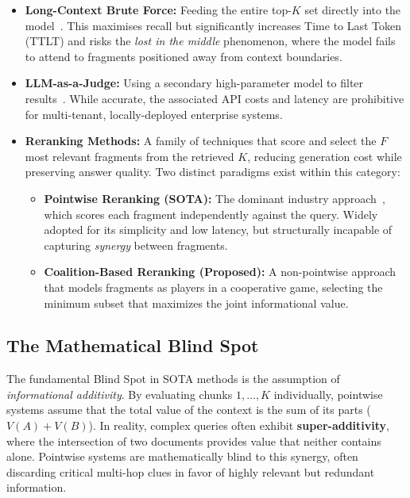 \begin{itemize}
    \item \textbf{Long-Context Brute Force:} Feeding the entire top-$K$ set directly into the model~\cite{LongContext}. This maximises recall but significantly increases Time to Last Token (TTLT) and risks the \emph{lost in the middle} phenomenon, where the model fails to attend to fragments positioned away from context boundaries.
    \item \textbf{LLM-as-a-Judge:} Using a secondary high-parameter model to filter results~\cite{LLLMJudges}. While accurate, the associated API costs and latency are prohibitive for multi-tenant, locally-deployed enterprise systems.
    \item \textbf{Reranking Methods:} A family of techniques that score and select the $F$ most relevant fragments from the retrieved $K$, reducing generation cost while preserving answer quality. Two distinct paradigms exist within this category:
    \begin{itemize}
        \item \textbf{Pointwise Reranking (SOTA):} The dominant industry approach~\cite{CrossEncoder}, which scores each fragment independently against the query. Widely adopted for its simplicity and low latency, but structurally incapable of capturing \emph{synergy} between fragments.
        \item \textbf{Coalition-Based Reranking (Proposed):} A non-pointwise approach that models fragments as players in a cooperative game, selecting the minimum subset that maximizes the joint informational value.
    \end{itemize}
\end{itemize}

\subsection{The Mathematical Blind Spot}
\label{subsec:blind-spot}
The fundamental Blind Spot in SOTA methods is the assumption of \textit{informational additivity}. By evaluating chunks $1, \dots, K$ individually, pointwise systems assume that the total value of the context is the sum of its parts ($V(A) + V(B)$). In reality, complex queries often exhibit \textbf{super-additivity}, where the intersection of two documents provides value that neither contains alone. Pointwise systems are mathematically blind to this synergy, often discarding critical multi-hop clues in favor of highly relevant but redundant information.

